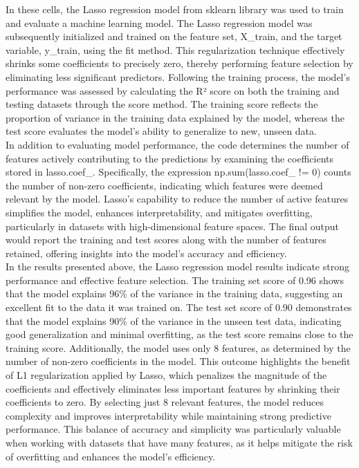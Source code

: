 \documentclass[12pt]{article}
\begin{document}
In these cells, the Lasso regression model from sklearn library was used to train and evaluate a machine learning model. The Lasso regression model was subsequently initialized and trained on the feature set, X\_train, and the target variable, y\_train, using the fit method. This regularization technique effectively shrinks some coefficients to precisely zero, thereby performing feature selection by eliminating less significant predictors. Following the training process, the model's performance was assessed by calculating the R² score on both the training and testing datasets through the score method. The training score reflects the proportion of variance in the training data explained by the model, whereas the test score evaluates the model's ability to generalize to new, unseen data.\\	
\indent In addition to evaluating model performance, the code determines the number of features actively contributing to the predictions by examining the coefficients stored in lasso.coef\_. Specifically, the expression np.sum(lasso.coef\_ != 0) counts the number of non-zero coefficients, indicating which features were deemed relevant by the model. Lasso's capability to reduce the number of active features simplifies the model, enhances interpretability, and mitigates overfitting, particularly in datasets with high-dimensional feature spaces. The final output would report the training and test scores along with the number of features retained, offering insights into the model's accuracy and efficiency.\\
\indent In the results presented above, the Lasso regression model results indicate strong performance and effective feature selection. The training set score of 0.96 shows that the model explains 96\% of the variance in the training data, suggesting an excellent fit to the data it was trained on. The test set score of 0.90 demonstrates that the model explains 90\% of the variance in the unseen test data, indicating good generalization and minimal overfitting, as the test score remains close to the training score. Additionally, the model uses only 8 features, as determined by the number of non-zero coefficients in the model. This outcome highlights the benefit of L1 regularization applied by Lasso, which penalizes the magnitude of the coefficients and effectively eliminates less important features by shrinking their coefficients to zero. By selecting just 8 relevant features, the model reduces complexity and improves interpretability while maintaining strong predictive performance. This balance of accuracy and simplicity was particularly valuable when working with datasets that have many features, as it helps mitigate the risk of overfitting and enhances the model's efficiency.\\
\end{document}
